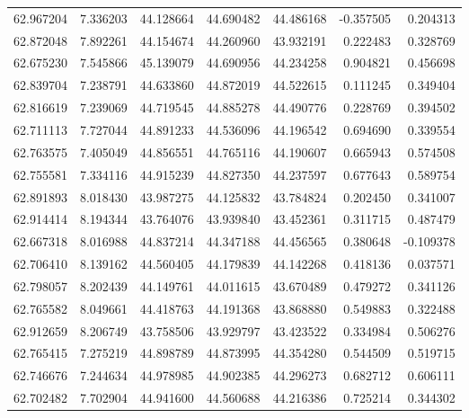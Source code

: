 \begin{tabular}{rrrrrrr}
 62.967204 &   7.336203 &         44.128664 &         44.690482 &         44.486168 & -0.357505 &  0.204313 \\
 62.872048 &   7.892261 &         44.154674 &         44.260960 &         43.932191 &  0.222483 &  0.328769 \\
 62.675230 &   7.545866 &         45.139079 &         44.690956 &         44.234258 &  0.904821 &  0.456698 \\
 62.839704 &   7.238791 &         44.633860 &         44.872019 &         44.522615 &  0.111245 &  0.349404 \\
 62.816619 &   7.239069 &         44.719545 &         44.885278 &         44.490776 &  0.228769 &  0.394502 \\
 62.711113 &   7.727044 &         44.891233 &         44.536096 &         44.196542 &  0.694690 &  0.339554 \\
 62.763575 &   7.405049 &         44.856551 &         44.765116 &         44.190607 &  0.665943 &  0.574508 \\
 62.755581 &   7.334116 &         44.915239 &         44.827350 &         44.237597 &  0.677643 &  0.589754 \\
 62.891893 &   8.018430 &         43.987275 &         44.125832 &         43.784824 &  0.202450 &  0.341007 \\
 62.914414 &   8.194344 &         43.764076 &         43.939840 &         43.452361 &  0.311715 &  0.487479 \\
 62.667318 &   8.016988 &         44.837214 &         44.347188 &         44.456565 &  0.380648 & -0.109378 \\
 62.706410 &   8.139162 &         44.560405 &         44.179839 &         44.142268 &  0.418136 &  0.037571 \\
 62.798057 &   8.202439 &         44.149761 &         44.011615 &         43.670489 &  0.479272 &  0.341126 \\
 62.765582 &   8.049661 &         44.418763 &         44.191368 &         43.868880 &  0.549883 &  0.322488 \\
 62.912659 &   8.206749 &         43.758506 &         43.929797 &         43.423522 &  0.334984 &  0.506276 \\
 62.765415 &   7.275219 &         44.898789 &         44.873995 &         44.354280 &  0.544509 &  0.519715 \\
 62.746676 &   7.244634 &         44.978985 &         44.902385 &         44.296273 &  0.682712 &  0.606111 \\
 62.702482 &   7.702904 &         44.941600 &         44.560688 &         44.216386 &  0.725214 &  0.344302 \\

\end{tabular}
